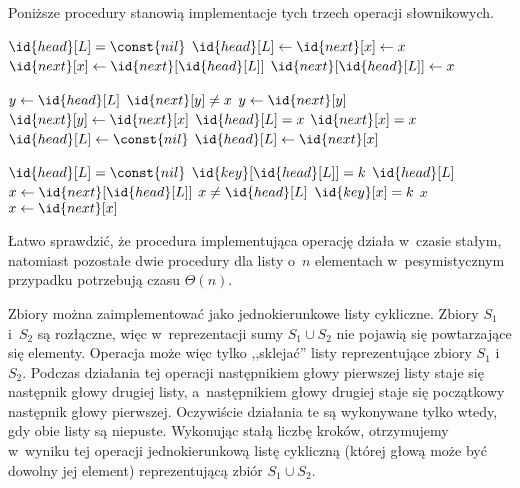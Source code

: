 Poniższe procedury stanowią implementacje tych trzech operacji słownikowych.
\begin{codebox}
\li	\If $\id{head}[L]=\const{nil}$
\li		\Then $\id{head}[L]\gets\id{next}[x]\gets x$
\li		\Else
			$\id{next}[x]\gets\id{next}[\id{head}[L]]$
\li			$\id{next}[\id{head}[L]]\gets x$
		\End
\end{codebox}

\begin{codebox}
\li	$y\gets\id{head}[L]$
\li	\While $\id{next}[y]\ne x$
\li		\Do $y\gets\id{next}[y]$
		\End
\li	$\id{next}[y]\gets\id{next}[x]$
\li	\If $\id{head}[L]=x$
\li		\Then
			\If $\id{next}[x]=x$
\li				\Then $\id{head}[L]\gets\const{nil}$
\li				\Else $\id{head}[L]\gets\id{next}[x]$
				\End
		\End
\end{codebox}

\begin{codebox}
\li	\If $\id{head}[L]=\const{nil}$
\li		\Then \Return {}
		\End
\li	\If $\id{key}[\id{head}[L]]=k$
\li		\Then \Return $\id{head}[L]$
		\End
\li	$x\gets\id{next}[\id{head}[L]]$
\li	\While $x\ne\id{head}[L]$
\li		\Do
			\If $\id{key}[x]=k$
\li				\Then \Return $x$
				\End
\li			$x\gets\id{next}[x]$
		\End
\li	\Return {}
\end{codebox}

Łatwo sprawdzić, że procedura implementująca operację  działa w~czasie stałym, natomiast pozostałe dwie procedury dla listy o~$n$ elementach w~pesymistycznym przypadku potrzebują czasu $\Theta(n)$.

\exercise %
Zbiory można zaimplementować jako jednokierunkowe listy cykliczne. Zbiory $S_1$ i~$S_2$ są rozłączne, więc w~reprezentacji sumy $S_1\cup S_2$ nie pojawią się powtarzające się elementy. Operacja  może więc tylko ,,sklejać'' listy reprezentujące zbiory $S_1$ i~$S_2$. Podczas działania tej operacji następnikiem głowy pierwszej listy staje się następnik głowy drugiej listy, a~następnikiem głowy drugiej staje się początkowy następnik głowy pierwszej. Oczywiście działania te są wykonywane tylko wtedy, gdy obie listy są niepuste. Wykonując stałą liczbę kroków, otrzymujemy w~wyniku tej operacji jednokierunkową listę cykliczną (której głową może być dowolny jej element) reprezentującą zbiór $S_1\cup S_2$.

